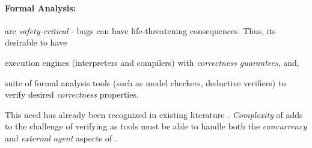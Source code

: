 \paragraph{Formal Analysis:} \CDSS{} are \emph{safety-critical} -
bugs can have life-threatening consequences. Thus, its desirable to have
\begin{enumerate*}[label=(\alph*)]
  \item execution engines (interpreters and compilers) with \emph{correctness guarantees}, and,
  \item suite of formal analysis tools (such as model checkers, deductive
    verifiers) to verify desired \emph{correctness} properties.
\end{enumerate*}
This need has already been recognized in existing literature \cite{SuttonAMIA03, ShaharAMIA96}.
\emph{Complexity} of \CDSSs{} adds to the challenge of verifying
\CDSSs{} as tools must be able to handle both the \emph{concurrency} and
\emph{external agent} aspects of \CDSSs{}.


